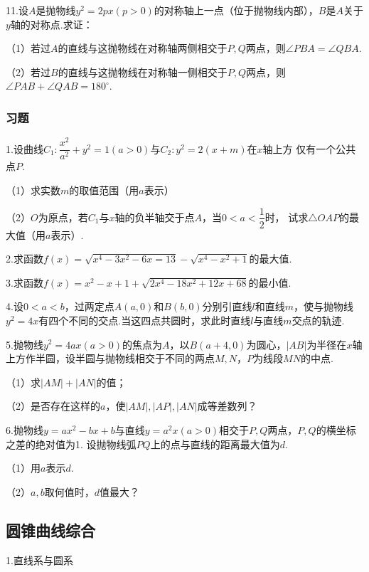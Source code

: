 11.设$A$是抛物线$y^2=2px(p>0)$的对称轴上一点（位于抛物线内部），$B$是$A$关于$y$轴的对称点.求证：

（1）若过$A$的直线与这抛物线在对称轴两侧相交于$P,Q$两点，则$\angle PBA=\angle QBA$.

（2）若过$B$的直线与这抛物线在对称轴一侧相交于$P,Q$两点，则$\angle PAB+\angle QAB=180^{\circ}$.

\vspace{50mm}

\subsubsection{习题}
1.设曲线$C_1:\dfrac{x^2}{a^2}+y^2=1(a>0)$与$C_2:y^2=2(x+m)$在$x$轴上方
仅有一个公共点$P$.

（1）求实数$m$的取值范围（用$a$表示）

（2）$O$为原点，若$C_1$与$x$轴的负半轴交于点$A$，当$0<a<\dfrac{1}{2}$时，
试求$\bigtriangleup OAP$的最大值（用$a$表示）.

\newpage

2.求函数$f(x)=\sqrt{x^4-3x^2-6x=13}-\sqrt{x^4-x^2+1}$的最大值.
\vspace{40mm}

3.求函数$f(x)=x^2-x+1+\sqrt{2x^4-18x^2+12x+68}$的最小值.
\vspace{40mm}

4.设$0<a<b$，过两定点$A(a,0)$和$B(b,0)$分别引直线$l$和直线$m$，使与抛物线
$y^2=4x$有四个不同的交点.当这四点共圆时，求此时直线$l$与直线$m$交点的轨迹.
\vspace{40mm}

5.抛物线$y^2=4ax(a>0)$的焦点为$A$，以$B(a+4,0)$为圆心，$|AB|$为半径在$x$轴
上方作半圆，设半圆与抛物线相交于不同的两点$M,N$，$P$为线段$MN$的中点.

（1）求$|AM|+|AN|$的值；

（2）是否存在这样的$a$，使$|AM|,|AP|,|AN|$成等差数列？
\vspace{40mm}

6.抛物线$y=ax^2-bx+b$与直线$y=a^2x(a>0)$相交于$P,Q$两点，$P,Q$的横坐标之差的绝对值为1.
设抛物线弧$PQ$上的点与直线的距离最大值为$d$.

（1）用$a$表示$d$.

（2）$a,b$取何值时，$d$值最大？
\newpage

\subsection{圆锥曲线综合}

1.直线系与圆系


